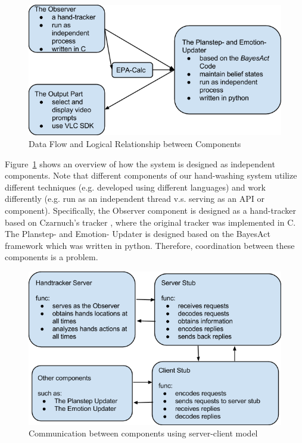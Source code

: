 \begin{figure}[h!]
\centering
\includegraphics[width=0.8\linewidth]{fig/dataflow.png}
\caption{Data Flow and Logical Relationship between Components}
\label{fig:dataflow}
\end{figure}


Figure~\ref{fig:dataflow} shows an overview of how the system is designed as independent components. Note that different components of our hand-washing system utilize different techniques (e.g. developed using different languages) and work differently (e.g. run as an independent thread v.s. serving as an API or component). Specifically, the Observer component is designed as a hand-tracker based on Czarnuch's tracker \cite{czarnuch2014}, where the original tracker was implemented in C. The Planstep- and Emotion- Updater is designed based on the BayesAct framework \cite{hoey2013bayesian} which was written in python. Therefore, coordination between these components is a problem. 


\begin{figure}[h!]
\centering
\includegraphics[width=0.8\linewidth]{fig/communication.png}
\caption{Communication between components using server-client model}
\label{fig:communication}
\end{figure}

